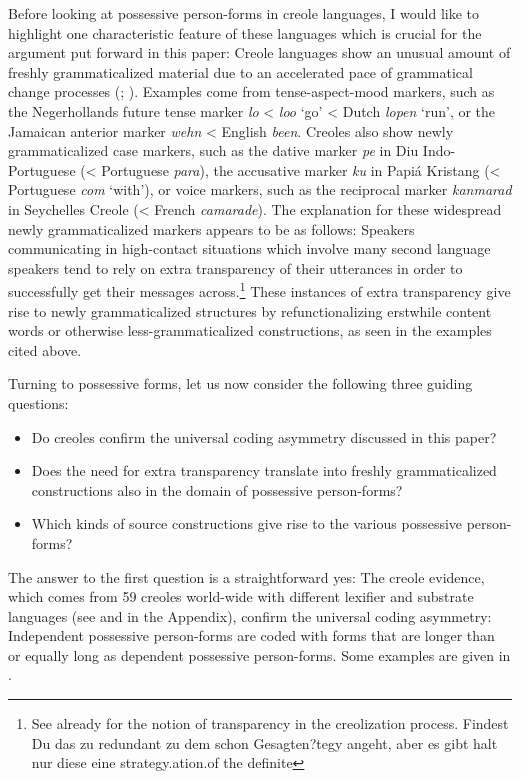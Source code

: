 \documentclass[output=paper]{langsci/langscibook}
\begin{document}
Before looking at possessive person-forms in creole languages, I would like to highlight one characteristic feature of these languages which is crucial for the argument put forward in this paper: Creole languages show an unusual amount of freshly grammaticalized material due to an accelerated pace of grammatical change processes (\citealt{HaspelmathMichaelis2017}; \citealt{MichaelisHaspelmath2018}). Examples come from tense-aspect-mood markers, such as the Negerhollands future tense marker \textit{lo} < \textit{loo} ‘go’ < Dutch \textit{lopen} ‘run’, or the Jamaican anterior marker \textit{wehn} < English \textit{been}. Creoles also show newly grammaticalized case markers, such as the dative marker \textit{pe} in Diu Indo-Portuguese (< Portuguese \textit{para}), the accusative marker \textit{ku} in Papiá Kristang (< Portuguese \textit{com} ‘with’), or voice markers, such as the reciprocal marker \textit{kanmarad} in Seychelles Creole (< French \textit{camarade}). The explanation for these widespread newly grammaticalized markers appears to be as follows: Speakers communicating in high-contact situations which involve many second language speakers tend to rely on extra transparency of their utterances in order to successfully get their messages across.\footnote{See already \citet{SeurenWekker1986} for the notion of transparency in the creolization process. Findest Du das zu redundant zu dem schon Gesagten?tegy angeht, aber es gibt halt nur diese eine strategy.ation.of the definite}  These instances of extra transparency give rise to newly grammaticalized structures by refunctionalizing erstwhile content words or otherwise less-grammaticalized constructions, as seen in the examples cited above.

Turning to possessive forms, let us now consider the following three guiding questions: 

\begin{itemize}
\item Do creoles confirm the universal coding asymmetry discussed in this paper?
\item Does the need for extra transparency translate into freshly grammaticalized constructions also in the domain of possessive person-forms?
\item Which kinds of source constructions give rise to the various possessive person-forms?
\end{itemize}

The answer to the first question is a straightforward yes: The creole evidence, which comes from 59 creoles world-wide with different lexifier and substrate languages (see \citealt{HaspelmathApics2013} and  in the Appendix), confirm the universal coding asymmetry: Independent possessive person-forms are coded with forms that are longer than or equally long as dependent possessive person-forms. Some examples are given in . 
\end{document}
